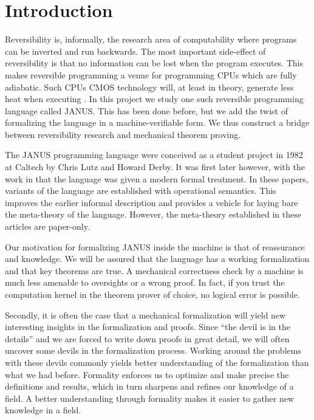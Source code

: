 \chapter{Introduction}

Reversibility is, informally, the research area of computability where
programs can be inverted and run backwards. The most important
side-effect of reversibility is that no information can be lost when
the program executes. This makes reversible programming a venue for
programming CPUs which are fully adiabatic. Such CPUs CMOS technology
will, at least in theory, generate less heat when executing
\cite{landauer:irreversibility}. In this project we study one such
reversible programming language called JANUS. This has been done
before, but we add the twist of formalizing the language in a
machine-verifiable form. We thus construct a bridge between
reversibility research and mechanical theorem proving.

The JANUS programming language were conceived as a student project in
1982 at Caltech by Chris Lutz and Howard Derby. It was first later
however, with the work in \cite{yokoyama.gluck:reversible,
  yokoyama.axelsen.ea:principles} that the language was given a modern
formal treatment. In these papers, variants of the language are
established with operational semantics. This improves the earlier
informal description and provides a vehicle for laying bare the
meta-theory of the language. However, the meta-theory established in
these articles are paper-only.

Our motivation for formalizing JANUS inside the machine is that of
reassurance and knowledge. We will be assured that the language has a
working formalization and that key theorems are true. A mechanical
correctness check by a machine is much less amenable to oversights or a
wrong proof. In fact, if you trust the computation kernel in the
theorem prover of choice, no logical error is possible.

Secondly, it is often the case that a mechanical formalization will
yield new interesting insights in the formalization and proofs. Since
``the devil is in the details'' and we are forced to write down proofs
in great detail, we will often uncover some devils in the
formalization process. Working around the problems with these devils
commonly yields better understanding of the formalization than what we
had before. Formality enforces us to optimize and make precise the
definitions and results, which in turn sharpens and refines our
knowledge of a field. A better understanding through formality makes
it easier to gather new knowledge in a field.

